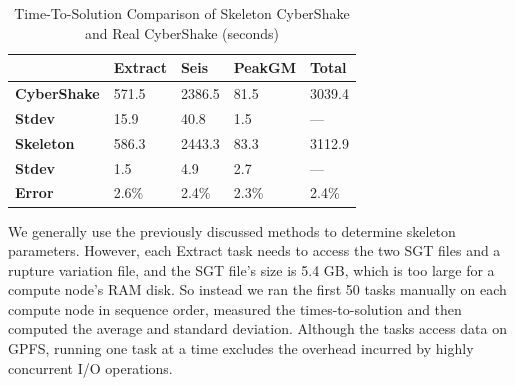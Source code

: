 \documentclass[preprint,12pt]{elsarticle}
\newcommand{\zhaonote}[1]{{\textcolor{cyan}{ ***Zhao:  #1 }}}
\newcommand{\zhaonote}[1]{}
\newcommand{\B}[1]{\textbf{#1}\xspace}
\begin{document}
\begin{table}[t]
\begin{center}
    \caption{Time-To-Solution Comparison of Skeleton CyberShake and Real CyberShake (seconds)}
    \begin{scriptsize}
        \begin{tabular}{ @{} p{1.5cm} p{1cm} p{1cm} p{1.2cm} p{1cm} @{} }
    \toprule
                   & \B{Extract} & \B{Seis}   & \B{PeakGM} & \B{Total}  \\ 
    \midrule
    \B{CyberShake} & 571.5       & 2386.5     & 81.5       & 3039.4     \\
    \B{Stdev     } &  15.9       &   40.8     &  1.5       &    ---     \\
    \B{Skeleton  } & 586.3       & 2443.3     & 83.3       & 3112.9     \\
    \B{Stdev     } &   1.5       &    4.9     &  2.7       &    ---     \\
    \B{Error     } & 2.6\%       & 2.4\%      & 2.3\%      & 2.4\%      \\
    \bottomrule
    \end{tabular}
    \end{scriptsize}
    \label{tb:cybershake-results}
\end{center}   
\end{table}




We generally use the previously discussed methods to determine skeleton parameters.
However, each Extract task needs to access the two SGT files and a rupture variation file, and the SGT file's size is 5.4 GB, which is too large for a compute node's RAM disk.
So instead we ran the first 50 tasks manually on each compute node in sequence order, measured the times-to-solution and 
then computed the average and standard deviation. 
Although the tasks access data on GPFS, running one task at a time excludes the overhead  incurred  by highly concurrent I/O operations. 
\end{document}
